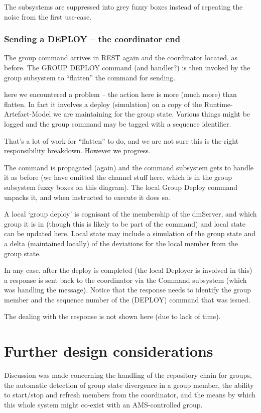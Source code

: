 \documentclass[a4paper,12pt]{article}
\begin{document}
The subsystems are suppressed into grey fuzzy boxes instead of repeating the noise from the first use-case.

\subsubsection*{Sending a DEPLOY -- the coordinator end}
The group command arrives in REST again and the coordinator located, as before. The GROUP DEPLOY command (and handler?) is then invoked by the group subsystem to ``flatten'' the command for sending.

here we encountered a problem -- the action here is more (much more) than flatten. In fact it involves a deploy (simulation) on a copy of the Runtime-Artefact-Model we are maintaining for the group state. Various things might be logged and the group command may be tagged with a sequence identifier.

That's a lot of work for ``flatten'' to do, and we are not sure this is the right responsibility breakdown. However we progress.

The command is propagated (again) and the command subsystem gets to handle it as before (we have omitted the channel stuff here, which is in the group subsystem fuzzy boxes on this diagram).  The local Group Deploy command unpacks it, and when instructed to execute it does so.

A local `group deploy' is cognisant of the membership of the dmServer, and which group it is in (though this is likely to be part of the command) and local state can be updated here. Local state may include a simulation of the group state and a delta (maintained locally) of the deviations for the local member from the group state.

In any case, after the deploy is completed (the local Deployer is involved in this) a response is sent back to the coordinator via the Command subsystem (which was handling the message).  Notice that the response needs to identify the group member and the sequence number of the (DEPLOY) command that was issued.

The dealing with the response is not shown here (due to lack of time).
  
\section{Further design considerations}
Discussion was made concerning the handling of the repository chain for groups, the automatic detection of group state divergence in a group member, the ability to start/stop and refresh members from the coordinator, and the means by which this whole system might co-exist with an AMS-controlled group.
\end{document}
